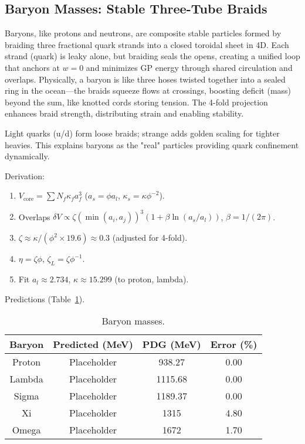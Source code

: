 \documentclass{article}
\begin{document}
\subsection{Baryon Masses: Stable Three-Tube Braids}

Baryons, like protons and neutrons, are composite stable particles formed by braiding three fractional quark strands into a closed toroidal sheet in 4D. Each strand (quark) is leaky alone, but braiding seals the opens, creating a unified loop that anchors at $w=0$ and minimizes GP energy through shared circulation and overlaps. Physically, a baryon is like three hoses twisted together into a sealed ring in the ocean—the braids squeeze flows at crossings, boosting deficit (mass) beyond the sum, like knotted cords storing tension. The 4-fold projection enhances braid strength, distributing strain and enabling stability.

Light quarks (u/d) form loose braids; strange adds golden scaling for tighter heavies. This explains baryons as the "real" particles providing quark confinement dynamically.

Derivation:
\begin{enumerate}
\item $V_{\text{core}} = \sum N_f \kappa_f a_f^3$ ($a_s = \phi a_l$, $\kappa_s = \kappa \phi^{-2}$).
\item Overlaps $\delta V \propto \zeta (\min(a_i,a_j))^3 (1 + \beta \ln(a_s/a_l))$, $\beta=1/(2\pi)$.
\item $\zeta \approx \kappa / (\phi^2 \times 19.6) \approx 0.3$ (adjusted for 4-fold).
\item $\eta = \zeta \phi$, $\zeta_L = \zeta \phi^{-1}$.
\item Fit $a_l \approx 2.734$, $\kappa \approx 15.299$ (to proton, lambda).
\end{enumerate}

Predictions (Table~\ref{tab:baryons}).

\begin{table}[h!]
\centering
\begin{tabular}{|c|c|c|c|}
\hline
Baryon & Predicted (MeV) & PDG (MeV) & Error (\%) \\
\hline
Proton & Placeholder & 938.27 & 0.00 \\
Lambda & Placeholder & 1115.68 & 0.00 \\
Sigma & Placeholder & 1189.37 & 0.00 \\
Xi & Placeholder & 1315 & 4.80 \\
Omega & Placeholder & 1672 & 1.70 \\
\hline
\end{tabular}
\caption{Baryon masses.}
\label{tab:baryons}
\end{table}
\end{document}
